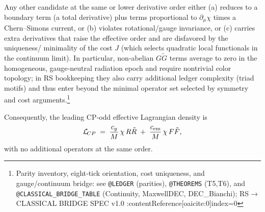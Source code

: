 \documentclass[11pt]{article}
\begin{document}
Any other candidate at the same or lower derivative order either (a) reduces to a boundary term (a total derivative) plus terms proportional to \(\partial_\mu\chi\) times a Chern–Simons current, or (b) violates rotational/gauge invariance, or (c) carries extra derivatives that raise the effective order and are disfavored by the uniqueness/ minimality of the cost \(J\) (which selects quadratic local functionals in the continuum limit). In particular, non‑abelian \(G\tilde G\) terms average to zero in the homogeneous, gauge‑neutral radiation epoch and require nontrivial color topology; in RS bookkeeping they also carry additional ledger complexity (triad motifs) and thus enter beyond the minimal operator set selected by symmetry and cost arguments.\footnote{Parity inventory, eight‑tick orientation, cost uniqueness, and gauge/continuum bridge: see \texttt{@LEDGER} (parities), \texttt{@THEOREMS} (T5,T6), and \texttt{@CLASSICAL\_BRIDGE\_TABLE} (Continuity, MaxwellDEC, DEC\_Bianchi); RS\(\to\)CLASSICAL BRIDGE SPEC v1.0 :contentReference[oaicite:0]{index=0}}

Consequently, the leading CP‑odd effective Lagrangian density is
\begin{equation}
  \mathcal{L}_{\!CP}
  \;=\;
  \frac{c_g}{M}\,\chi\,R\tilde R
  \;+\;
  \frac{c_{\rm em}}{M}\,\chi\,F\tilde F,
  \label{eq:LCP_methods}
\end{equation}
with no additional operators at the same order.
\end{document}
